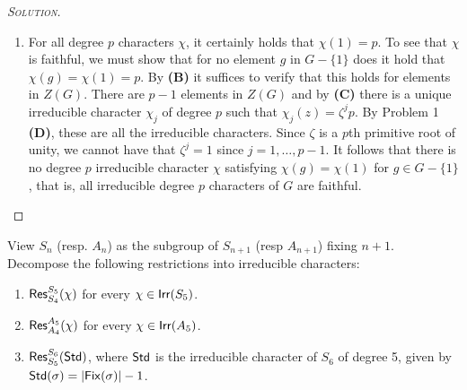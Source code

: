 \begin{proof}[{\scshape Solution}]
\begin{enumerate}[font=\normalfont,label=\textbf{(\Alph*)}, wide]
    \item For all degree $p$ characters $\chi$, it certainly holds that $\chi(1) =p$. To see that $\chi$ is faithful, we must show that for no element $g$ in $G-\{1\}$ does it hold that $\chi(g) = \chi(1) = p$. By \textbf{(B)} it suffices to verify that this holds for elements in $Z(G)$. There are $p-1$ elements in $Z(G)$ and by \textbf{(C)} there is a unique irreducible character $\chi_j$ of degree $p$ such that $\chi_j(z) = \zeta^jp$. By Problem 1 \textbf{(D)}, these are all the irreducible characters. Since $\zeta$ is a $p$th primitive root of unity, we cannot have that $\zeta^j = 1$ since $j = 1, \ldots, p-1$. It follows that there is no degree $p$ irreducible character $\chi$ satisfying $\chi(g) = \chi(1)$ for $g\in G-\{1\}$, that is, all irreducible degree $p$ characters of $G$ are faithful.


  \end{enumerate}
\end{proof}

\newpage

\begin{problem}
  View $S_n$ (resp. $A_n$) as the subgroup of $S_{n+1}$ (resp $A_{n+1}$) fixing $n+1$. Decompose the following restrictions into irreducible characters:
  \begin{enumerate}[font=\normalfont,label=\textbf{(\Alph*)}]


    \item $\mathsf{Res}^{S_5}_{S_4}(\chi)$ for every $\chi \in\mathsf{Irr}(S_5)$.
    \item $\mathsf{Res}^{A_5}_{A_4}(\chi)$ for every $\chi \in\mathsf{Irr}(A_5)$.
    \item $\mathsf{Res}^{S_6}_{S_5}(\mathsf{Std})$, where $\mathsf{Std}$ is the irreducible character of $S_6$ of degree 5, given by $\mathsf{Std}(\sigma) = \lvert \mathsf{Fix}(\sigma) \rvert - 1$.
  \end{enumerate}
\end{problem}

